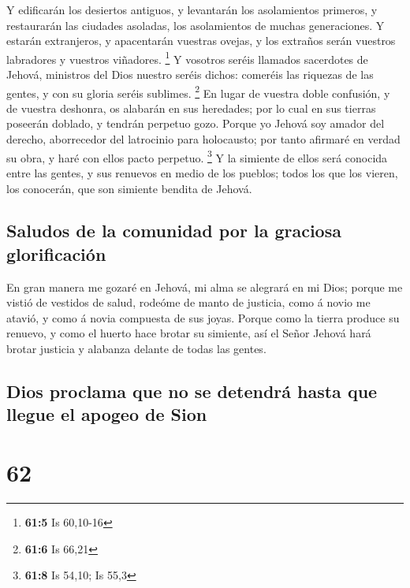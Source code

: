  Y edificarán los desiertos antiguos, y levantarán los
asolamientos primeros, y restaurarán las ciudades asoladas, los
asolamientos de muchas generaciones.  Y estarán
extranjeros, y apacentarán vuestras ovejas, y los extraños serán
vuestros labradores y vuestros viñadores. \footnote{\textbf{61:5} Is
  60,10-16}  Y vosotros seréis llamados sacerdotes de
Jehová, ministros del Dios nuestro seréis dichos: comeréis las riquezas
de las gentes, y con su gloria seréis sublimes. \footnote{\textbf{61:6}
  Is 66,21}  En lugar de vuestra doble confusión, y de
vuestra deshonra, os alabarán en sus heredades; por lo cual en sus
tierras poseerán doblado, y tendrán perpetuo gozo.  Porque
yo Jehová soy amador del derecho, aborrecedor del latrocinio para
holocausto; por tanto afirmaré en verdad su obra, y haré con ellos pacto
perpetuo. \footnote{\textbf{61:8} Is 54,10; Is 55,3}  Y la
simiente de ellos será conocida entre las gentes, y sus renuevos en
medio de los pueblos; todos los que los vieren, los conocerán, que son
simiente bendita de Jehová.

\hypertarget{saludos-de-la-comunidad-por-la-graciosa-glorificaciuxf3n}{%
\subsection{Saludos de la comunidad por la graciosa
glorificación}\label{saludos-de-la-comunidad-por-la-graciosa-glorificaciuxf3n}}

 En gran manera me gozaré en Jehová, mi alma se alegrará
en mi Dios; porque me vistió de vestidos de salud, rodeóme de manto de
justicia, como á novio me atavió, y como á novia compuesta de sus joyas.
 Porque como la tierra produce su renuevo, y como el
huerto hace brotar su simiente, así el Señor Jehová hará brotar justicia
y alabanza delante de todas las gentes.

\hypertarget{dios-proclama-que-no-se-detendruxe1-hasta-que-llegue-el-apogeo-de-sion}{%
\subsection{Dios proclama que no se detendrá hasta que llegue el apogeo
de
Sion}\label{dios-proclama-que-no-se-detendruxe1-hasta-que-llegue-el-apogeo-de-sion}}

\hypertarget{section-61}{%
\section{62}\label{section-61}}

